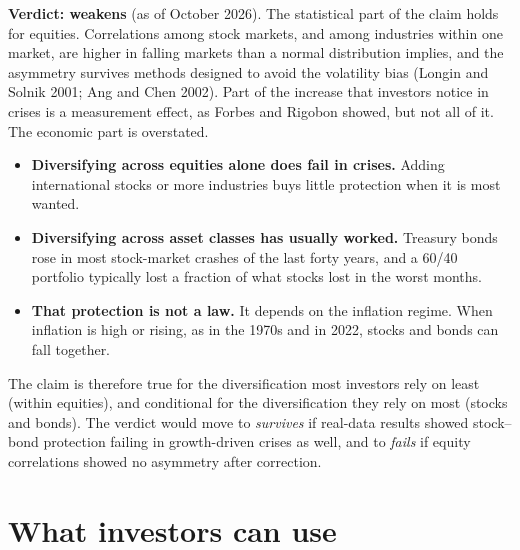 \begin{callout}
\textbf{Verdict: weakens} (as of October 2026). The statistical part of the claim holds for equities. Correlations among stock markets, and among industries within one market, are higher in falling markets than a normal distribution implies, and the asymmetry survives methods designed to avoid the volatility bias (Longin and Solnik 2001; Ang and Chen 2002). Part of the increase that investors notice in crises is a measurement effect, as Forbes and Rigobon showed, but not all of it. The economic part is overstated.
\end{callout}

\begin{itemize}
  \item \textbf{Diversifying across equities alone does fail in crises.} Adding international stocks or more industries buys little protection when it is most wanted.
  \item \textbf{Diversifying across asset classes has usually worked.} Treasury bonds rose in most stock-market crashes of the last forty years, and a 60/40 portfolio typically lost a fraction of what stocks lost in the worst months.
  \item \textbf{That protection is not a law.} It depends on the inflation regime. When inflation is high or rising, as in the 1970s and in 2022, stocks and bonds can fall together.
\end{itemize}

The claim is therefore true for the diversification most investors rely on least (within equities), and conditional for the diversification they rely on most (stocks and bonds). The verdict would move to \emph{survives} if real-data results showed stock--bond protection failing in growth-driven crises as well, and to \emph{fails} if equity correlations showed no asymmetry after correction.

\section{What investors can use}
\label{sec:20-investors}

